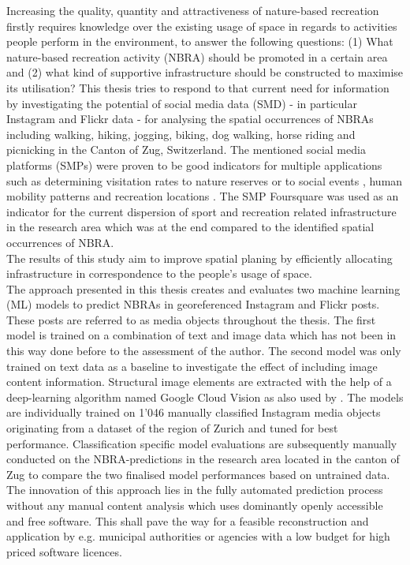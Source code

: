 Increasing the quality, quantity and attractiveness of nature-based recreation firstly requires knowledge over the existing usage of space in regards to activities people perform in the environment, to answer the following questions: (1) What nature-based recreation activity (NBRA) should be promoted in a certain area and (2) what kind of supportive infrastructure should be constructed to maximise its utilisation? This thesis tries to respond to that current need for information by investigating the potential of social media data (SMD) - in particular Instagram and Flickr data - for analysing the spatial occurrences of NBRAs including walking, hiking, jogging, biking, dog walking, horse riding and picnicking in the Canton of Zug, Switzerland. The mentioned social media platforms (SMPs) were proven to be good indicators for multiple applications such as determining visitation rates to nature reserves \parencite{Tenkanen2017, Heikinheimo2017, Keeler2015, Wood2013} or to social events \parencite{Pettersson2011}, human mobility patterns \parencite{Barchiesi2015, Grossenbacher2014} and recreation locations \parencite{Weyland2014, Hill2006, Neuvonen2010}. The SMP Foursquare was used as an indicator for the current dispersion of sport and recreation related infrastructure in the research area which was at the end compared to the identified spatial occurrences of NBRA.\\
The results of this study aim to improve spatial planing by efficiently allocating infrastructure in correspondence to the people's usage of space.\\
\newline
The approach presented in this thesis creates and evaluates two machine learning (ML) models to predict NBRAs in georeferenced Instagram and Flickr posts. These posts are referred to as media objects throughout the thesis. The first model is trained on a combination of text and image data which has not been in this way done before to the assessment of the author. The second model was only trained on text data as a baseline to investigate the effect of including image content information. Structural image elements are extracted with the help of a deep-learning algorithm named Google Cloud Vision as also used by \parencite{Richards2018}. The models are individually trained on 1'046 manually classified Instagram media objects originating from a dataset of the region of Zurich \parencite{Gruzd2016} and tuned for best performance. Classification specific model evaluations are subsequently manually conducted on the NBRA-predictions in the research area located in the canton of Zug to compare the two finalised model performances based on untrained data. The innovation of this approach lies in the fully automated prediction process without any manual content analysis which uses dominantly openly accessible and free software. This shall pave the way for a feasible reconstruction and application by e.g. municipal authorities or agencies with a low budget for high priced software licences.
